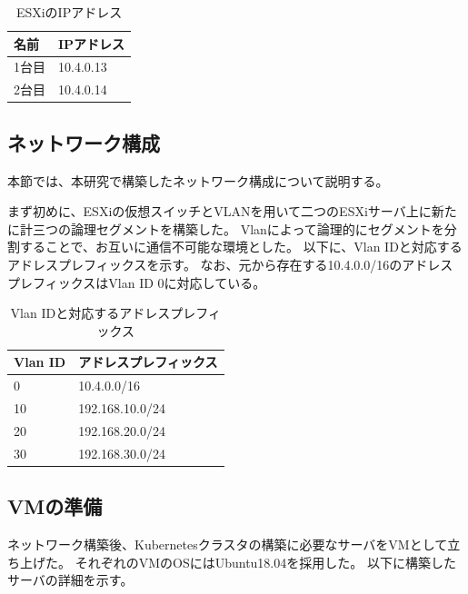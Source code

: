 \begin{table}[htb]
  \begin{center}
    \caption{ESXiのIPアドレス}
    \begin{tabular}{|l|l|} \hline
      名前 & IPアドレス \\ \hline
      1台目 & 10.4.0.13 \\ \hline
      2台目 & 10.4.0.14 \\ \hline
    \end{tabular}
  \end{center}
\end{table}

\subsection{ネットワーク構成}
\label{implementation:network-environment}

本節では、本研究で構築したネットワーク構成について説明する。

まず初めに、ESXiの仮想スイッチとVLANを用いて二つのESXiサーバ上に新たに計三つの論理セグメントを構築した。
Vlanによって論理的にセグメントを分割することで、お互いに通信不可能な環境とした。
以下に、Vlan IDと対応するアドレスプレフィックスを示す。
なお、元から存在する10.4.0.0/16のアドレスプレフィックスはVlan ID 0に対応している。

\begin{table}[htb]
  \begin{center}
    \caption{Vlan IDと対応するアドレスプレフィックス}
    \begin{tabular}{|l|l|} \hline
      Vlan ID & アドレスプレフィックス \\ \hline
      0 & 10.4.0.0/16 \\ \hline
      10 & 192.168.10.0/24 \\ \hline
      20 & 192.168.20.0/24 \\ \hline
      30 & 192.168.30.0/24 \\ \hline
    \end{tabular}
  \end{center}
\end{table}

\subsection{VMの準備}

ネットワーク構築後、Kubernetesクラスタの構築に必要なサーバをVMとして立ち上げた。
それぞれのVMのOSにはUbuntu18.04を採用した。
以下に構築したサーバの詳細を示す。

